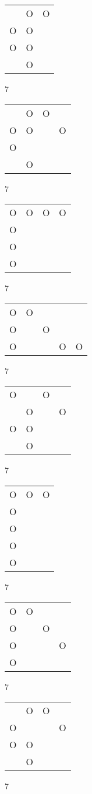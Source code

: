 \begin{tabular}{|m{0.2cm}m{0.2cm}m{0.2cm}|}\hline
 &O&O\\
O&O& \\
O&O& \\
 &O& \\
\hline\end{tabular}7
\begin{tabular}{|m{0.2cm}m{0.2cm}m{0.2cm}m{0.2cm}|}\hline
 &O&O& \\
O&O& &O\\
O& & & \\
 &O& & \\
\hline\end{tabular}7
\begin{tabular}{|m{0.2cm}m{0.2cm}m{0.2cm}m{0.2cm}|}\hline
O&O&O&O\\
O& & & \\
O& & & \\
O& & & \\
\hline\end{tabular}7
\begin{tabular}{|m{0.2cm}m{0.2cm}m{0.2cm}m{0.2cm}m{0.2cm}|}\hline
O&O& & & \\
O& &O& & \\
O& & &O&O\\
\hline\end{tabular}7
\begin{tabular}{|m{0.2cm}m{0.2cm}m{0.2cm}m{0.2cm}|}\hline
O& &O& \\
 &O& &O\\
O&O& & \\
 &O& & \\
\hline\end{tabular}7
\begin{tabular}{|m{0.2cm}m{0.2cm}m{0.2cm}|}\hline
O&O&O\\
O& & \\
O& & \\
O& & \\
O& & \\
\hline\end{tabular}7
\begin{tabular}{|m{0.2cm}m{0.2cm}m{0.2cm}m{0.2cm}|}\hline
O&O& & \\
O& &O& \\
O& & &O\\
O& & & \\
\hline\end{tabular}7
\begin{tabular}{|m{0.2cm}m{0.2cm}m{0.2cm}m{0.2cm}|}\hline
 &O&O& \\
O& & &O\\
O&O& & \\
 &O& & \\
\hline\end{tabular}7
